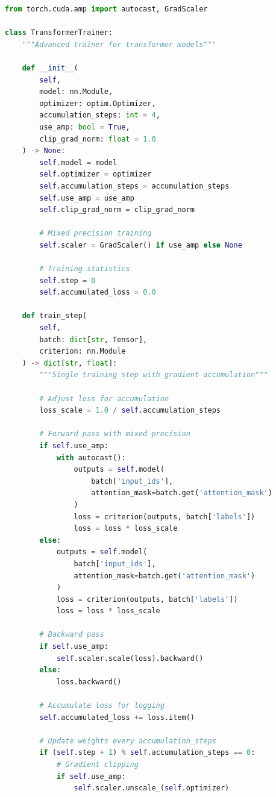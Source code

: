 \documentclass[11pt]{article}
\begin{document}
\begin{lstlisting}[language=Python, caption=Gradient Accumulation with Mixed Precision]
from torch.cuda.amp import autocast, GradScaler

class TransformerTrainer:
    """Advanced trainer for transformer models"""
    
    def __init__(
        self,
        model: nn.Module,
        optimizer: optim.Optimizer,
        accumulation_steps: int = 4,
        use_amp: bool = True,
        clip_grad_norm: float = 1.0
    ) -> None:
        self.model = model
        self.optimizer = optimizer
        self.accumulation_steps = accumulation_steps
        self.use_amp = use_amp
        self.clip_grad_norm = clip_grad_norm
        
        # Mixed precision training
        self.scaler = GradScaler() if use_amp else None
        
        # Training statistics
        self.step = 0
        self.accumulated_loss = 0.0
        
    def train_step(
        self,
        batch: dict[str, Tensor],
        criterion: nn.Module
    ) -> dict[str, float]:
        """Single training step with gradient accumulation"""
        
        # Adjust loss for accumulation
        loss_scale = 1.0 / self.accumulation_steps
        
        # Forward pass with mixed precision
        if self.use_amp:
            with autocast():
                outputs = self.model(
                    batch['input_ids'],
                    attention_mask=batch.get('attention_mask')
                )
                loss = criterion(outputs, batch['labels'])
                loss = loss * loss_scale
        else:
            outputs = self.model(
                batch['input_ids'],
                attention_mask=batch.get('attention_mask')
            )
            loss = criterion(outputs, batch['labels'])
            loss = loss * loss_scale
        
        # Backward pass
        if self.use_amp:
            self.scaler.scale(loss).backward()
        else:
            loss.backward()
        
        # Accumulate loss for logging
        self.accumulated_loss += loss.item()
        
        # Update weights every accumulation_steps
        if (self.step + 1) % self.accumulation_steps == 0:
            # Gradient clipping
            if self.use_amp:
                self.scaler.unscale_(self.optimizer)
            

\end{lstlisting}
\end{document}
